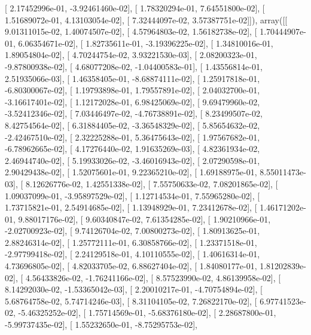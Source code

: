 \documentclass{article}
\begin{document}
       [  2.17452996e-01,  -3.92461460e-02],
       [  1.78320294e-01,   7.64551800e-02],
       [  1.51689072e-01,   4.13103054e-02],
       [  7.32444097e-02,   3.57387751e-02]]), array([[  9.01311015e-02,   1.40074507e-02],
       [  4.57964803e-02,   1.56182738e-02],
       [  1.70444907e-01,   6.06354671e-02],
       [  1.82735611e-01,  -3.19396225e-02],
       [  1.34810016e-01,   1.89054804e-02],
       [  4.70244754e-02,   3.93221530e-03],
       [  2.08200323e-01,  -9.87800938e-02],
       [  4.68077208e-02,  -1.04400583e-01],
       [  1.43556814e-01,   2.51935066e-03],
       [  1.46358405e-01,  -8.68874111e-02],
       [  1.25917818e-01,  -6.80300067e-02],
       [  1.19793898e-01,   1.79557891e-02],
       [  2.04032700e-01,  -3.16617401e-02],
       [  1.12172028e-01,   6.98425069e-02],
       [  9.69479960e-02,  -3.52412346e-02],
       [  7.03446497e-02,  -4.76738891e-02],
       [  8.23499507e-02,   8.42754564e-02],
       [  6.31884405e-02,  -3.36548329e-02],
       [  5.85654632e-02,  -2.42467510e-02],
       [  2.32225288e-01,   5.36475643e-02],
       [  1.97567682e-01,  -6.78962665e-02],
       [  4.17276440e-02,   1.91635269e-03],
       [  4.82361934e-02,   2.46944740e-02],
       [  5.19933026e-02,  -3.46016943e-02],
       [  2.07290598e-01,   2.90429438e-02],
       [  1.52075601e-01,   9.22365210e-02],
       [  1.69188975e-01,   8.55011473e-03],
       [  8.12626776e-02,   1.42551338e-02],
       [  7.55750633e-02,   7.08201865e-02],
       [  1.09037099e-01,  -3.95897529e-02],
       [  1.12714534e-01,   7.55965280e-02],
       [  1.73715821e-01,   2.54914685e-02],
       [  1.13948929e-01,   7.23412678e-02],
       [  1.46171202e-01,   9.88017176e-02],
       [  9.60340847e-02,   7.61354285e-02],
       [  1.90210966e-01,  -2.02700923e-02],
       [  9.74126704e-02,   7.00800273e-02],
       [  1.80913625e-01,   2.88246314e-02],
       [  1.25772111e-01,   6.30858766e-02],
       [  1.23371518e-01,  -2.97799418e-02],
       [  2.24129518e-01,   4.10110555e-02],
       [  1.40616314e-01,   4.73696805e-02],
       [  4.82033705e-02,   6.88627404e-02],
       [  1.84080177e-01,   1.81202839e-02],
       [  4.56433826e-02,  -1.76241166e-02],
       [  8.57523990e-02,   4.86139958e-02],
       [  8.14292030e-02,  -1.53365042e-03],
       [  2.20010217e-01,  -4.70754894e-02],
       [  5.68764758e-02,   5.74714246e-03],
       [  8.31104105e-02,   7.26822170e-02],
       [  6.97741523e-02,  -5.46325252e-02],
       [  1.75714569e-01,  -5.68376180e-02],
       [  2.28687800e-01,  -5.99737435e-02],
       [  1.55232650e-01,  -8.75295753e-02],
\end{document}
